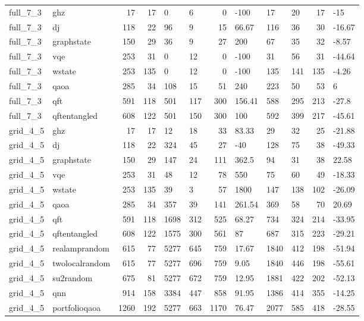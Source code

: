 \begin{longtable}{llrrllrlllrl}
full\_7\_3 & ghz & 17 & 17 & 0 & 6 & 0 & -100 & 17 & 20 & 17 & -15 \\
full\_7\_3 & dj & 118 & 22 & 96 & 9 & 15 & 66.67 & 116 & 36 & 30 & -16.67 \\
full\_7\_3 & graphstate & 150 & 29 & 36 & 9 & 27 & 200 & 67 & 35 & 32 & -8.57 \\
full\_7\_3 & vqe & 253 & 31 & 0 & 12 & 0 & -100 & 31 & 56 & 31 & -44.64 \\
full\_7\_3 & wstate & 253 & 135 & 0 & 12 & 0 & -100 & 135 & 141 & 135 & -4.26 \\
full\_7\_3 & qaoa & 285 & 34 & 108 & 15 & 51 & 240 & 223 & 50 & 53 & 6 \\
full\_7\_3 & qft & 591 & 118 & 501 & 117 & 300 & 156.41 & 588 & 295 & 213 & -27.8 \\
full\_7\_3 & qftentangled & 608 & 122 & 501 & 150 & 300 & 100 & 592 & 399 & 217 & -45.61 \\
grid\_4\_5 & ghz & 17 & 17 & 12 & 18 & 33 & 83.33 & 29 & 32 & 25 & -21.88 \\
grid\_4\_5 & dj & 118 & 22 & 324 & 45 & 27 & -40 & 128 & 75 & 38 & -49.33 \\
grid\_4\_5 & graphstate & 150 & 29 & 147 & 24 & 111 & 362.5 & 94 & 31 & 38 & 22.58 \\
grid\_4\_5 & vqe & 253 & 31 & 48 & 12 & 78 & 550 & 75 & 60 & 49 & -18.33 \\
grid\_4\_5 & wstate & 253 & 135 & 39 & 3 & 57 & 1800 & 147 & 138 & 102 & -26.09 \\
grid\_4\_5 & qaoa & 285 & 34 & 357 & 39 & 141 & 261.54 & 369 & 58 & 70 & 20.69 \\
grid\_4\_5 & qft & 591 & 118 & 1698 & 312 & 525 & 68.27 & 734 & 324 & 214 & -33.95 \\
grid\_4\_5 & qftentangled & 608 & 122 & 1575 & 300 & 561 & 87 & 687 & 315 & 223 & -29.21 \\
grid\_4\_5 & realamprandom & 615 & 77 & 5277 & 645 & 759 & 17.67 & 1840 & 412 & 198 & -51.94 \\
grid\_4\_5 & twolocalrandom & 615 & 77 & 5277 & 696 & 759 & 9.05 & 1840 & 446 & 198 & -55.61 \\
grid\_4\_5 & su2random & 675 & 81 & 5277 & 672 & 759 & 12.95 & 1881 & 422 & 202 & -52.13 \\
grid\_4\_5 & qnn & 914 & 158 & 3384 & 447 & 858 & 91.95 & 1386 & 414 & 355 & -14.25 \\
grid\_4\_5 & portfolioqaoa & 1260 & 192 & 5277 & 663 & 1170 & 76.47 & 2077 & 585 & 418 & -28.55 \\

\end{longtable}
